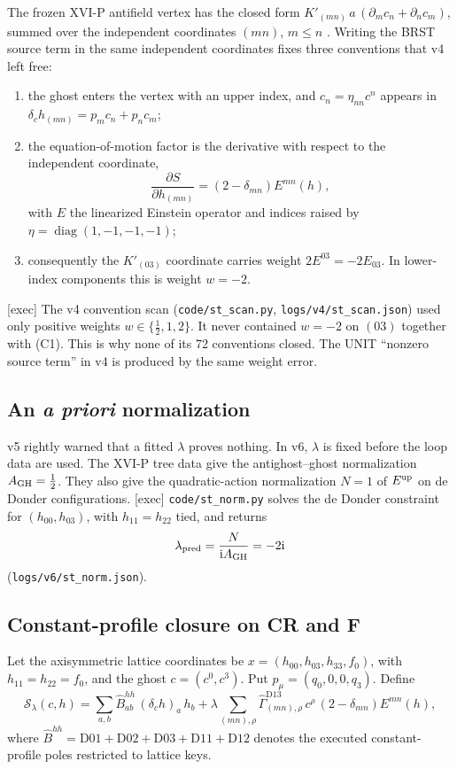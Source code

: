 \documentclass[11pt,a4paper]{article}
\newcommand{\ii}{\mathrm i}
\newcommand{\loc}[1]{\nolinkurl{#1}}
\DeclareMathOperator{\diag}{diag}
\theoremstyle{plain}
\theoremstyle{definition}
\theoremstyle{remark}
\numberwithin{equation}{section}
\begin{document}
The frozen XVI-P antifield vertex has the closed form
\(K'_{(mn)}\,a\,(\partial_mc_n+\partial_nc_m)\), summed over the
independent coordinates \((mn)\), \(m\le n\) \cite{CheungP}.
Writing the BRST source term in the same independent coordinates
fixes three conventions that v4 left free:
\begin{enumerate}[label=\textup{(C\arabic*)}]
\item the ghost enters the vertex with an upper index, and
\(c_n=\eta_{nn}c^n\) appears in
\(\delta_ch_{(mn)}=p_mc_n+p_nc_m\);
\item the equation-of-motion factor is the derivative with respect
to the independent coordinate,
\[
\frac{\partial S}{\partial h_{(mn)}}=(2-\delta_{mn})E^{mn}(h),
\]
with \(E\) the linearized Einstein operator and indices raised by
\(\eta=\diag(1,-1,-1,-1)\);
\item consequently the \(K'_{(03)}\) coordinate carries weight
\(2E^{03}=-2E_{03}\).
In lower-index components this is weight \(w=-2\).
\end{enumerate}
\textsf{[exec]} The v4 convention scan (\loc{code/st_scan.py},
\loc{logs/v4/st_scan.json}) used only
positive weights \(w\in\{\tfrac12,1,2\}\).
It never contained \(w=-2\) on \((03)\) together with (C1).
This is why none of its 72 conventions closed.
The UNIT ``nonzero source term'' in v4 is produced by the same
weight error.

\subsection{An \emph{a priori} normalization}

v5 rightly warned that a fitted \(\lambda\) proves nothing.
In v6, \(\lambda\) is fixed before the loop data are used.
The XVI-P tree data give the antighost--ghost normalization
\(A_{\rm GH}=\tfrac12\).
They also give the quadratic-action normalization \(N=1\) of
\(E^{\rm up}\) on de Donder configurations.
\textsf{[exec]} \loc{code/st_norm.py} solves the de Donder
constraint for \((h_{00},h_{03})\), with \(h_{11}=h_{22}\) tied, and
returns
\[
\lambda_{\rm pred}=\frac{N}{\ii A_{\rm GH}}=-2\ii
\]
(\loc{logs/v6/st_norm.json}).

\subsection{Constant-profile closure on CR and F}

Let the axisymmetric lattice coordinates be
\(x=(h_{00},h_{03},h_{33},f_0)\), with
\(h_{11}=h_{22}=f_0\), and the ghost \(c=(c^0,c^3)\).
Put \(p_\mu=(q_0,0,0,q_3)\).
Define
\begin{equation}
\mathcal S_\lambda(c,h)=
\sum_{a,b}\widehat B^{hh}_{ab}\,(\delta_ch)_a\,h_b
+\lambda\sum_{(mn),\rho}
\widehat\Gamma^{\mathrm{D13}}_{(mn),\rho}\,c^\rho\,
(2-\delta_{mn})E^{mn}(h),
\label{eq:STv6}
\end{equation}
where
\(\widehat B^{hh}=\mathrm{D01+D02+D03+D11+D12}\)
denotes the executed constant-profile poles restricted to lattice
keys.
\end{document}
